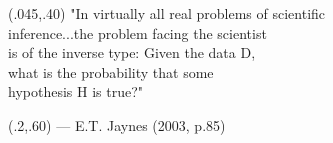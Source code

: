 \documentclass[
paper=128mm:96mm, %
fontsize=11pt, %
pagesize, %
parskip=half-, %
]{scrartcl}
\theoremstyle{mythmstyle} %
\begin{document}
 
\begin{textblock}{1}(.045,.40)
  \small {"In virtually all real problems of scientific \\
  inference...the problem facing the scientist \\
  is of the inverse type: Given the data D, \\
  what is the probability that some \\
  hypothesis H is true?"}
\end{textblock}

\begin{textblock}{1}(.2,.60)
  \tiny {--- E.T. Jaynes (2003, p.85)}
\end{textblock}
\end{document}

